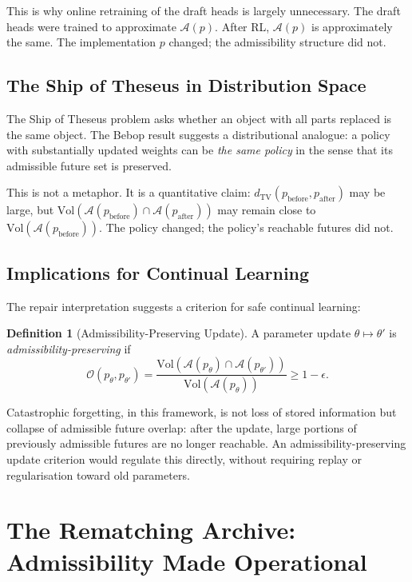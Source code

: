 \documentclass[11pt, a4paper, openany]{book}
\theoremstyle{plain}
\theoremstyle{definition}
\newtheorem{definition}[theorem]{Definition}
\theoremstyle{remark}
\newcommand{\TV}{d_{\mathrm{TV}}}
\newcommand{\Vol}{\mathrm{Vol}}
\begin{document}
This is why online retraining of the draft heads is largely unnecessary.
The draft heads were trained to approximate $\mathcal{A}(p)$.
After RL, $\mathcal{A}(p)$ is approximately the same.
The implementation $p$ changed; the admissibility structure did not.

\section{The Ship of Theseus in Distribution Space}

The Ship of Theseus problem asks whether an object with all parts replaced
is the same object.
The Bebop result suggests a distributional analogue:
a policy with substantially updated weights can be \emph{the same policy}
in the sense that its admissible future set is preserved.

This is not a metaphor.
It is a quantitative claim: $\TV(p_{\mathrm{before}}, p_{\mathrm{after}})$
may be large, but $\Vol(\mathcal{A}(p_{\mathrm{before}}) \cap \mathcal{A}(p_{\mathrm{after}}))$
may remain close to $\Vol(\mathcal{A}(p_{\mathrm{before}}))$.
The policy changed; the policy's reachable futures did not.

\section{Implications for Continual Learning}

The repair interpretation suggests a criterion for safe continual learning:
\begin{definition}[Admissibility-Preserving Update]
  A parameter update $\theta \mapsto \theta'$ is \emph{admissibility-preserving}
  if
  \[
    \mathcal{O}(p_\theta, p_{\theta'}) = \frac{\Vol(\mathcal{A}(p_\theta) \cap
    \mathcal{A}(p_{\theta'}))}{\Vol(\mathcal{A}(p_\theta))} \geq 1 - \epsilon.
  \]
\end{definition}

Catastrophic forgetting, in this framework, is not loss of stored information
but collapse of admissible future overlap: after the update, large portions
of previously admissible futures are no longer reachable.
An admissibility-preserving update criterion would regulate this directly,
without requiring replay or regularisation toward old parameters.

\chapter{The Rematching Archive: Admissibility Made Operational}
\label{ch:archive}
\end{document}

